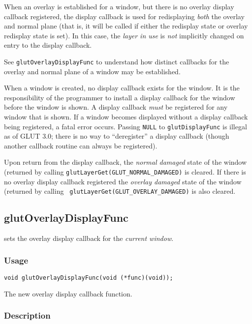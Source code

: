 When an overlay is established for a window, but there is no overlay display
callback registered, the display callback is used for redisplaying
{\em both} the overlay and normal
plane (that is, it will be called if either the redisplay
state or overlay redisplay state is set).  In this case, the {\em layer in use} is {\em not}
implicitly changed on entry to the display callback.

See {\tt glutOverlayDisplayFunc} to understand how distinct callbacks
for the overlay and normal plane of a window may be established.

When a window is created, no display callback exists for
the window. 
It is the responsibility of the programmer to install
a display callback for the window before the window is shown.
A display callback {\em must} be registered for any window that is
shown.  If a window becomes displayed without a display
callback being registered, a fatal error occurs. 
Passing {\tt NULL} to {\tt glutDisplayFunc} is illegal as of GLUT 3.0;
there is no way to ``deregister'' a display callback (though another
callback routine can always be registered).

Upon return from the display callback, the {\em normal damaged} state of the
window (returned by calling {\tt glutLayerGet(GLUT\_NORMAL\_DAMAGED)}
is cleared.  If there is no overlay display callback registered the
{\em overlay damaged} state of the window (returned by calling {\tt
glutLayerGet(GLUT\_OVERLAY\_DAMAGED)} is also cleared.

\subsection{glutOverlayDisplayFunc}

 sets the overlay display callback
for the {\em current window}.

\subsubsection*{Usage}

\begin{verbatim}
void glutOverlayDisplayFunc(void (*func)(void));
\end{verbatim}
\begin{description}
\itemsep 0in
\item[{\tt func}]
The new overlay display callback function.
\end{description}

\subsubsection*{Description}

